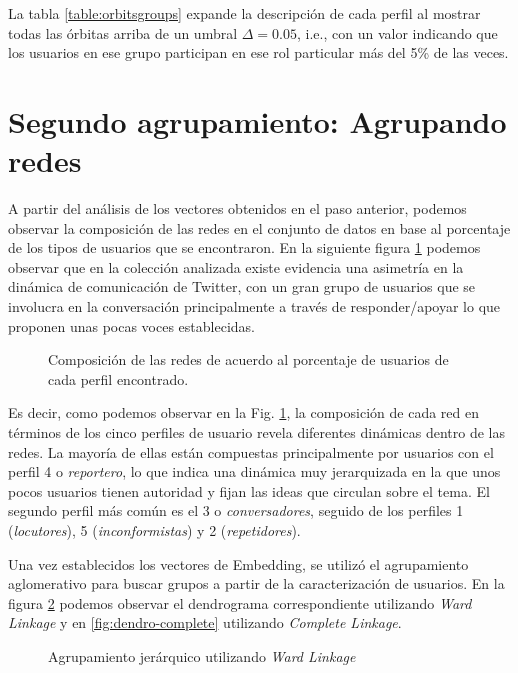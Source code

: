 La tabla \ref{table:orbitsgroups} expande la descripción de cada perfil al mostrar todas las órbitas arriba de un umbral $\Delta = 0.05$, i.e., con un valor indicando que los usuarios en ese grupo participan en ese rol particular más del 5\% de las veces. 

\section{Segundo agrupamiento: Agrupando redes}
\label{sec:experiments:clustering}

A partir del análisis de los vectores obtenidos en el paso anterior, podemos observar la composición de las redes en el conjunto de datos en base al porcentaje de los tipos de usuarios que se encontraron. En la siguiente figura \ref{fig:composition} podemos observar que en la colección analizada existe evidencia una asimetría en la dinámica de comunicación de Twitter, con un gran grupo de usuarios que se involucra en la conversación principalmente a través de responder/apoyar lo que proponen unas pocas voces establecidas.  

 \begin{figure}[htbp]
   \centering
   
    \caption{Composición de las redes de acuerdo al porcentaje de usuarios de cada perfil encontrado.}
    \label{fig:composition}
\end{figure}

Es decir, como podemos observar en la Fig. \ref{fig:composition}, la composición de cada red en términos de los cinco perfiles de usuario revela diferentes dinámicas dentro de las redes. La mayoría de ellas están compuestas principalmente por usuarios con el perfil 4 o \emph{reportero}, lo que indica una dinámica muy jerarquizada en la que unos pocos usuarios tienen autoridad y fijan las ideas que circulan sobre el tema. El segundo perfil más común es el 3 o \emph{conversadores}, seguido de los perfiles 1 (\emph{locutores}), 5 (\emph{inconformistas}) y 2 (\emph{repetidores}).

Una vez establecidos los vectores de Embedding, se utilizó  el agrupamiento aglomerativo para buscar grupos a partir de la caracterización de usuarios. En la figura \ref{fig:dendro-ward} podemos observar el dendrograma correspondiente utilizando \textit{Ward Linkage} y en \ref{fig:dendro-complete} utilizando \textit{Complete Linkage}.

 \begin{figure}[htbp]
   \centering
   
    \caption{Agrupamiento jerárquico utilizando \textit{Ward Linkage}}
    \label{fig:dendro-ward}
\end{figure}

